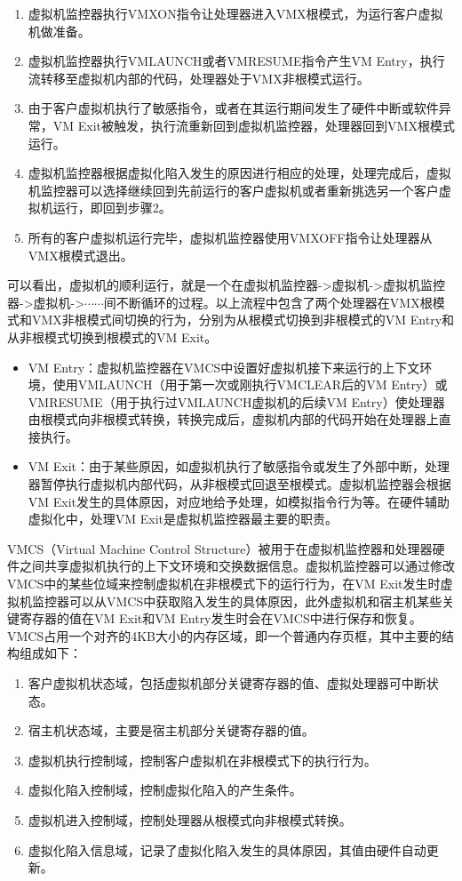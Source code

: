 \begin{enumerate}
\item 虚拟机监控器执行VMXON指令让处理器进入VMX根模式，为运行客户虚拟机做准备。
\item 虚拟机监控器执行VMLAUNCH或者VMRESUME指令产生VM Entry，执行流转移至虚拟机内部的代码，处理器处于VMX非根模式运行。
\item 由于客户虚拟机执行了敏感指令，或者在其运行期间发生了硬件中断或软件异常，VM Exit被触发，执行流重新回到虚拟机监控器，处理器回到VMX根模式运行。
\item 虚拟机监控器根据虚拟化陷入发生的原因进行相应的处理，处理完成后，虚拟机监控器可以选择继续回到先前运行的客户虚拟机或者重新挑选另一个客户虚拟机运行，即回到步骤2。
\item 所有的客户虚拟机运行完毕，虚拟机监控器使用VMXOFF指令让处理器从VMX根模式退出。
\end{enumerate}

可以看出，虚拟机的顺利运行，就是一个在虚拟机监控器->虚拟机->虚拟机监控器->虚拟机->$\cdots\cdots$间不断循环的过程。以上流程中包含了两个处理器在VMX根模式和VMX非根模式间切换的行为，分别为从根模式切换到非根模式的VM Entry和从非根模式切换到根模式的VM Exit。

\begin{itemize}
\item VM Entry：虚拟机监控器在VMCS中设置好虚拟机接下来运行的上下文环境，使用VMLAUNCH（用于第一次或刚执行VMCLEAR后的VM Entry）或VMRESUME（用于执行过VMLAUNCH虚拟机的后续VM Entry）使处理器由根模式向非根模式转换，转换完成后，虚拟机内部的代码开始在处理器上直接执行。
\item VM Exit：由于某些原因，如虚拟机执行了敏感指令或发生了外部中断，处理器暂停执行虚拟机内部代码，从非根模式回退至根模式。虚拟机监控器会根据VM Exit发生的具体原因，对应地给予处理，如模拟指令行为等。在硬件辅助虚拟化中，处理VM Exit是虚拟机监控器最主要的职责。
\end{itemize}

VMCS（Virtual Machine Control Structure）被用于在虚拟机监控器和处理器硬件之间共享虚拟机执行的上下文环境和交换数据信息。虚拟机监控器可以通过修改VMCS中的某些位域来控制虚拟机在非根模式下的运行行为，在VM Exit发生时虚拟机监控器可以从VMCS中获取陷入发生的具体原因，此外虚拟机和宿主机某些关键寄存器的值在VM Exit和VM Entry发生时会在VMCS中进行保存和恢复。VMCS占用一个对齐的4KB大小的内存区域，即一个普通内存页框，其中主要的结构组成如下：

\begin{enumerate}
\item 客户虚拟机状态域，包括虚拟机部分关键寄存器的值、虚拟处理器可中断状态。
\item 宿主机状态域，主要是宿主机部分关键寄存器的值。
\item 虚拟机执行控制域，控制客户虚拟机在非根模式下的执行行为。
\item 虚拟化陷入控制域，控制虚拟化陷入的产生条件。
\item 虚拟机进入控制域，控制处理器从根模式向非根模式转换。
\item 虚拟化陷入信息域，记录了虚拟化陷入发生的具体原因，其值由硬件自动更新。
\end{enumerate}

